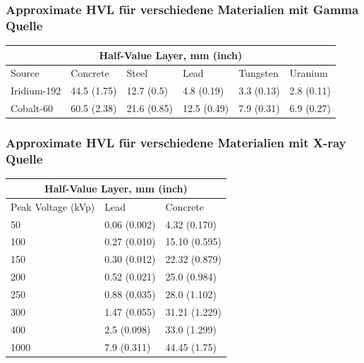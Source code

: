   \subsubsection{Approximate HVL für verschiedene Materialien mit Gamma Quelle}
  {
\begin{tabular}{ |p{3cm}||p{2cm}|p{2cm}|p{2cm}|p{2cm}|p{2cm}| }
 \hline
 \multicolumn{6}{|c|}{ Half-Value Layer, mm (inch)} \\
 \hline
 Source& Concrete &Steel &Lead&Tungsten&Uranium\\
  \hline
 Iridium-192 & 44.5 (1.75)&12.7 (0.5)&4.8 (0.19)&3.3 (0.13)&2.8 (0.11)\\
  \hline
 Cobalt-60   &60.5 (2.38)&21.6 (0.85)&12.5 (0.49)&7.9 (0.31)&6.9 (0.27)\\
 \hline
\end{tabular} 
\subsubsection{Approximate HVL für verschiedene Materialien mit X-ray Quelle}

{

\begin{tabular}{ |p{4cm}||p{3cm}|p{3cm}|  }
\hline
\multicolumn{3}{|c|}{Half-Value Layer, mm (inch)} \\
\hline
Peak Voltage (kVp) & Lead&Concrete \\
\hline
50&0.06 (0.002)& 4.32 (0.170) \\
\hline
100	&0.27 (0.010)&15.10 (0.595) \\
\hline
150	&0.30 (0.012)& 22.32 (0.879) \\
\hline
200& 0.52 (0.021) & 25.0 (0.984) \\
\hline
250& 0.88 (0.035)&28.0 (1.102)  \\
\hline
300& 1.47 (0.055) & 31.21 (1.229) \\
\hline
400& 2.5 (0.098)& 33.0 (1.299) \\
\hline
1000&7.9 (0.311) & 44.45 (1.75)\\
\hline
\end{tabular} \\


}}
